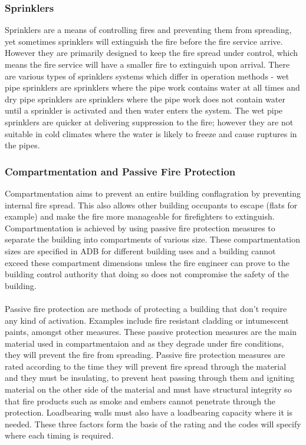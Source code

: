 \documentclass[table,a4paper,oneside]{book}
\begin{document}
\subsubsection{Sprinklers}
Sprinklers are a means of controlling fires and preventing them from spreading, yet sometimes sprinklers will extinguish the fire before the fire service arrive. However they are primarily designed to keep the fire spread under control, which means the fire service will have a smaller fire to extinguish upon arrival. There are various types of sprinklers systems which differ in operation methods - wet pipe sprinklers are sprinklers where the pipe work contains water at all times and dry pipe sprinklers are sprinklers where the pipe work does not contain water until a sprinkler is activated and then water enters the system. The wet pipe sprinklers are quicker at delivering suppression to the fire; however they are not suitable in cold climates where the water is likely to freeze and cause ruptures in the pipes.
\subsubsection{Compartmentation and Passive Fire Protection}
Compartmentation aims to prevent an entire building conflagration by preventing internal fire spread. This also allows other building occupants to escape (flats for example) and make the fire more manageable for firefighters to extinguish. Compartmentation is achieved by using passive fire protection measures to separate the building into compartments of various size. These compartmentation sizes are specified in ADB for different building uses and a building cannot exceed these compartment dimensions unless the fire engineer can prove to the building control authority that doing so does not compromise the safety of the building.
\\
\\
Passive fire protection are methods of protecting a building that don't require any kind of activation. Examples include fire resistant cladding or intumescent paints, amongst other measures. These passive protection measures are the main material used in compartmentaion and as they degrade under fire conditions, they will prevent the fire from spreading. Passive fire protection measures are rated according to the time they will prevent fire spread through the material and they must be insulating, to prevent heat passing through them and igniting material on the other side of the material and must have structural integrity so that fire products such as smoke and embers cannot penetrate through the protection. Loadbearing walls must also have a loadbearing capacity where it is needed. These three factors form the basis of the rating and the codes will specify where each timing is required.
\end{document}
